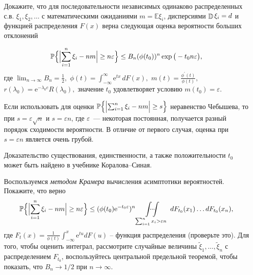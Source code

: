 \begin{problem}
Докажите, что для последовательности независимых одинаково распределенных с.в. $\xi_1,\xi_2,\dots$ с математическими ожиданиями $m = \mathbb{E} \xi_i$, дисперсиями $\mathop{\mathbb{D}}\nolimits \xi_i = d$ и функцией распределения $F(x)$ верна следующая оценка вероятности больших отклонений %

\begin{equation*}
\mathrm{{\mathbb P}}\Bigl\{\Bigl|\sum_{i=1}^n \xi_i -n m \Bigr|\geq n\varepsilon \Bigr\} \leq B_n(\phi(t_0))^n \exp\big(-t_0 n\varepsilon \bigr) ,
\end{equation*}
где 
$\lim_{n\to\infty}B_n=\frac{1}{2},$
$\phi(t)=\int_{-\infty}^{\infty}\text{e}^{t x}\,d F(x),$
$m(t) = \frac{\phi^{\prime}(t)}{\phi(t)},$
$r(\lambda_0) = \text{e}^{-\lambda_0 c}R(\lambda_0),$
значение $t_0$ удовлетворяет условию  $m(t_0) = \varepsilon$.

\end{problem}
\begin{remark}


Если использовать для оценки  $\mathrm{{\mathbb P}}\Bigl\{\Bigl|\sum_{i=1}^n\xi_i - n m\Bigr|\geq s\Bigr\}$ неравенство Чебышева, то при $s = \varepsilon \sqrt{n}$ и $s=\varepsilon n$, где $\varepsilon$~--- некоторая постоянная, получается разный порядок сходимости вероятности. В отличие от первого случая, оценка при $s=\varepsilon n$ является очень грубой. 

Доказательство существования, единственности, а также положительности $t_0$  может быть найдено в учебнике Коралова--Синая.

Воспользуемся \textit{методом Крамера} вычисления асимптотики вероятностей. Покажите, что верно 
\begin{equation*}
\mathrm{{\mathbb P}}\Bigl\{\Bigl|\sum_{i=1}^n \xi_i- n m\Bigr|\geq n \varepsilon \Bigr\} \leq (\phi(t_0)\text{e}^{-t_0\varepsilon})^n \idotsint\limits_{\sum_{i=1}^n x_i>\varepsilon n} \,dF_{t_0}(x_1) \dots dF_{t_0}(x_n),
\end{equation*}
где $F_t(x) = \frac{1}{\phi(t)}\int_{-\infty}^{x} \text{e}^{t u}d F(u)$ -- функция распределения (проверьте это).
Для того, чтобы оценить интеграл, рассмотрите случайные величины $\tilde{\xi}_1,\dots,\tilde{\xi}_n$ с распределением $F_{t_0}$, воспользуйтесь центральной предельной теоремой, чтобы показать, что $B_n\to1/2$ при ${n\to\infty}$.
\end{remark}



